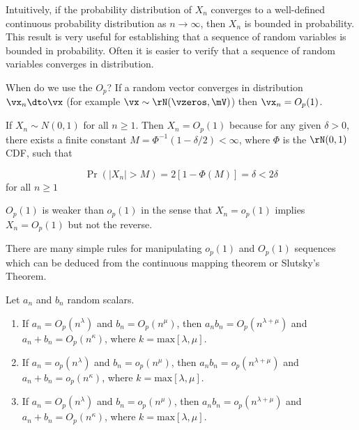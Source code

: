\documentclass[english,12pt]{book}\usepackage[]{graphicx}\usepackage[]{xcolor}
\begin{document}
Intuitively, if the probability distribution of $X_n$ converges to a well-defined continuous probability distribution as $n\to \infty$, then $X_n$ is bounded in probability. This result is very useful for establishing that a sequence of random variables is bounded in probability. Often it is easier to verify that a sequence of random variables converges in distribution.

When do we use the $O_p$?  If a random vector converges in distribution $\vx_n \dto \vx$ (for example $\vx\sim \rN(\vzeros, \mV)$) then $\vx_n = O_p(1)$.

\begin{example}
  If $X_n\sim N(0,1)$ for all $n\geq 1$. Then $X_n = O_p(1)$ because for any given $\delta > 0$, there exists a finite constant $M = \Phi^{-1}(1 - \delta/2)<\infty$, where $\Phi$ is the $\rN(0, 1)$ CDF, such that

  \begin{equation*}
    \Pr(\left|X_n\right| > M) = 2\left[1 - \Phi(M)\right] = \delta < 2\delta
  \end{equation*}
  for all $n \geq 1$
\end{example}

$O_p(1)$ is weaker than $o_p(1)$ in the sense that $X_n = o_p(1)$ implies $X_n = O_p(1)$ but not the reverse.

There are many simple rules for manipulating $o_p(1)$ and $O_p(1)$ sequences which can be deduced from the continuous mapping theorem or Slutsky's Theorem. 

\begin{proposition}\label{prop:blO-est}
Let $a_n$ and $b_n$ random scalars. 
\begin{enumerate}
  \item If $a_n=O_p(n^\lambda)$ and $b_n=O_p(n^\mu)$, then $a_nb_n=O_p(n^{\lambda + \mu})$ and $a_n + b_n = O_p(n^\kappa)$, where $k = \textrm{max}\left[\lambda, \mu\right]$.
  \item If $a_n = o_p(n^\lambda)$ and $b_n = o_p(n^\mu)$, then $a_nb_n=o_p(n^{\lambda + \mu})$ and $a_n + b_n = o_p(n^\kappa)$, where $k = \textrm{max}\left[\lambda, \mu\right]$.
  \item If $a_n=O_p(n^\lambda)$ and  $b_n = o_p(n^\mu)$, then $a_nb_n=o_p(n^{\lambda + \mu})$ and $a_n + b_n = O_p(n^\kappa)$, where $k = \textrm{max}\left[\lambda, \mu\right]$.
\end{enumerate}
\end{proposition}
\end{document}
